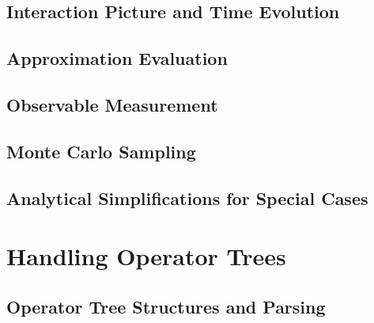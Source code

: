 \documentclass[
headings=optiontohead,              %
12pt,                               %
DIV=13,                             %
twoside=false,                      %
open=right,                         %
BCOR=00mm,                          %
toc=bibliographynumbered            %
]{scrreport}
\begin{document}
        \subsection{Interaction Picture and Time Evolution}
        \label{sec:theory-interaction-picture}
        
        \FloatBarrier
        
        \subsection{Approximation Evaluation}
        \label{sec:theory-approximation-evaluation}
        
        \FloatBarrier

        \subsection{Observable Measurement}
        \label{sec:theory-observables}
        
        \FloatBarrier

        \subsection{Monte Carlo Sampling}
        \label{sec:theory-monte-carlo}
        
        \FloatBarrier

        \subsection{Analytical Simplifications for Special Cases}
        \label{sec:theory-special-cases}
        
        \FloatBarrier

    \section{Handling Operator Trees}
    \label{sec:theory-parsing-linting}
    
    \FloatBarrier

        \subsection{Operator Tree Structures and Parsing}
        \label{sec:theory-operator-trees}
        
        \FloatBarrier
\end{document}
